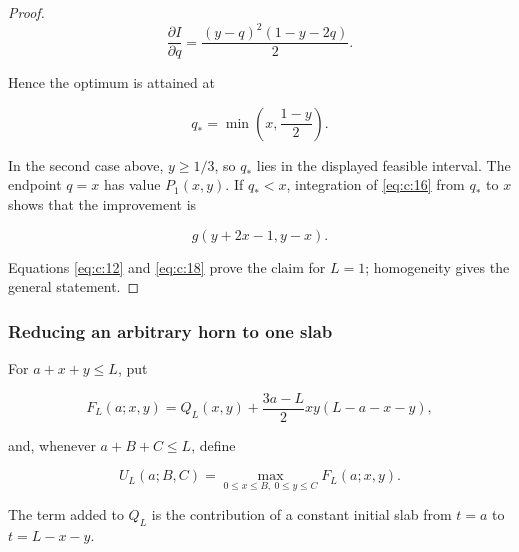 \begin{proof}
\begin{equation}
\frac{\partial I}{\partial q}
=\frac{(y-q)^2(1-y-2q)}2.
\label{eq:c:16}
\end{equation}

Hence the optimum is attained at

\begin{equation}
q_*=\min\left(x,\frac{1-y}{2}\right).
\label{eq:c:17}
\end{equation}

In the second case above, \(y\ge1/3\), so \(q_*\) lies in the displayed
feasible interval. The endpoint \(q=x\) has value \(P_1(x,y)\). If
\(q_*<x\), integration of \eqref{eq:c:16} from \(q_*\) to \(x\) shows that the
improvement is

\begin{equation}
g(y+2x-1,y-x).
\label{eq:c:18}
\end{equation}

Equations \eqref{eq:c:12} and \eqref{eq:c:18} prove the claim for \(L=1\); homogeneity gives the
general statement.
\end{proof}

\subsubsection{Reducing an arbitrary horn to one slab}

For \(a+x+y\le L\), put

\begin{equation}
F_L(a;x,y)=Q_L(x,y)
 +\frac{3a-L}{2}xy(L-a-x-y),
\label{eq:c:19}
\end{equation}

and, whenever \(a+B+C\le L\), define

\begin{equation}
U_L(a;B,C)=
\max_{0\le x\le B,\ 0\le y\le C}F_L(a;x,y).
\label{eq:c:20}
\end{equation}

The term added to \(Q_L\) is the contribution of a constant initial slab
from \(t=a\) to \(t=L-x-y\).

